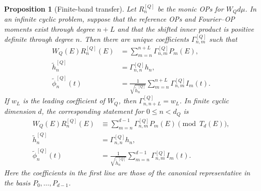 \documentclass[a4paper,11pt]{article}
\def\dd{d}%
\newtheorem{proposition}{Proposition}[section]
\theoremstyle{definition}
\theoremstyle{remark}
\newcommand{\dd}{\mathrm d}
\newcommand{\tphi}{\widetilde\phi}
\newcommand{\thh}{\widetilde h}
\begin{document}
\begin{proposition}[Finite-band transfer]
\label{prop:finite-band}
Let $R_n^{[Q]}$ be the monic OPs for $W_Q\dd\mu$. In an infinite cyclic problem, suppose that the reference OPs and Fourier--OP moments exist through degree $n+L$ and that the shifted inner product is positive definite through degree $n$. Then there are unique coefficients $\Gamma_{n,m}^{[Q]}$ such that
\begin{equation}
\begin{aligned}
   W_Q(E)R_n^{[Q]}(E)
   &=
   \sum_{m=n}^{n+L}\Gamma_{n,m}^{[Q]}P_m(E),\\
   \thh_n^{[Q]}
   &=
   \Gamma_{n,n}^{[Q]}h_n,\\
   \tphi_n^{[Q]}(t)
   &=
   \frac{1}{\sqrt{\thh_n^{[Q]}}}
   \sum_{m=n}^{n+L}\Gamma_{n,m}^{[Q]}I_m(t).
\end{aligned}
   \label{eq:finite-band-main}
\end{equation}
If $w_L$ is the leading coefficient of $W_Q$, then
$\Gamma_{n,n+L}^{[Q]}=w_L$. In finite cyclic dimension $d$, the corresponding statement for $0\le n<d_Q$ is
\begin{equation}
\begin{aligned}
   W_Q(E)R_n^{[Q]}(E)
   &\equiv
   \sum_{m=n}^{d-1}\Gamma_{n,m}^{[Q]}P_m(E)
   \pmod{T_d(E)},\\
   \thh_n^{[Q]}
   &=
   \Gamma_{n,n}^{[Q]}h_n,\\
   \tphi_n^{[Q]}(t)
   &=
   \frac{1}{\sqrt{\thh_n^{[Q]}}}
   \sum_{m=n}^{d-1}\Gamma_{n,m}^{[Q]}I_m(t).
\end{aligned}
   \label{eq:finite-band-quotient}
\end{equation}
Here the coefficients in the first line are those of the canonical representative in the basis $P_0,\ldots,P_{d-1}$.
\end{proposition}
\end{document}
